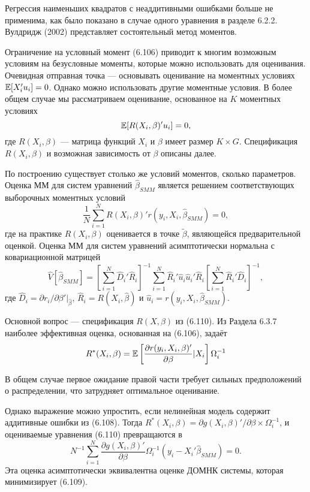 Регрессия наименьших квадратов с неаддитивными ошибками больше не применима, как было показано в случае одного уравнения в разделе 6.2.2. Вулдридж (2002) представляет состоятельный метод  моментов.

Ограничение на условный момент (6.106) приводит к многим возможным условиям на безусловные моменты, которые можно использовать для оценивания. Очевидная отправная точка --- основывать оценивание на моментных условиях $\mathbb{E}[X_i'u_i] = 0$. Однако можно использовать другие моментные условия. В более общем случае мы рассматриваем оценивание, основанное на $K$ моментных условиях
\begin{equation}
\mathbb{E}[R(X_i,\beta)'u_i] = 0,
\end{equation}
где $R(X_i,\beta)$ --- матрица функций $X_i$ и $\beta$ имеет размер $K \times G$. Спецификация $R(X_i,\beta)$ и возможная зависимость от $\beta$ описаны далее.

По построению существует столько же условий моментов, сколько параметров. Оценка ММ для систем уравнений $\hat{\beta}_{SMM}$ является решением соответствующих выборочных моментных условий 
\begin{equation}
\frac{1}{N} \sum_{i=1}^N R(X_i,\beta)'r(y_i,X_i,\hat{\beta}_{SMM}) = 0,
\end{equation}
где на практике $R(X_i, \beta)$ оценивается в точке $\tilde{\beta}$, являющейся предварительной оценкой. Оценка ММ для систем уравнений асимптотически нормальна с ковариационной матрицей
\begin{equation}
\hat{V}[\hat{\beta}_{SMM}] = \left[ \sum_{i=1}^N \hat{D}_i'\hat{R}_i \right]^{-1} \sum_{i=1}^N \hat{R}_i'\hat{u}_i\hat{u}_i'\hat{R}_i \left[ \sum_{i=1}^N \hat{R}_i'\hat{D}_i \right]^{-1},
\end{equation}
где $\hat{D}_i = \partial{r_i}/\partial{\beta'}|_{\hat{\beta}}$, $\hat{R}_i = R(X_i, \hat{\beta})$ и $\hat{u}_i = r(y_i, X_i, \hat{\beta}_{SMM})$.

Основной вопрос --- спецификация $R(X, \beta)$ из (6.110). Из Раздела 6.3.7 наиболее эффективная оценка, основанная на (6.106), задаёт
\begin{equation}
R^*(X_i, \beta) = \mathbb{E} \left[ \frac{\partial{r(y_i, X_i, \beta)'}}{\partial{\beta}}|X_i \right] \Omega_i^{-1}
\end{equation}

В общем случае первое ожидание правой части требует сильных предположений о распределении, что затрудняет оптимальное оценивание. 

Однако выражение можно упростить, если нелинейная модель содержит аддитивные ошибки из (6.108). Тогда $R^*(X_i, \beta) = \partial{g(X_i,\beta)'}/\partial{\beta} \times \Omega_i^{-1}$, и оцениваемые уравнения (6.110) превращаются в
\[
N^{-1} \sum_{i=1}^N \frac{\partial{g(X_i,\beta)'}}{\partial{\beta}}\Omega_i^{-1}(y_i - X_i'\hat{\beta}_{SMM}) = 0.
\]
Эта оценка асимптотически эквивалентна оценке ДОМНК системы, которая минимизирует (6.109).

